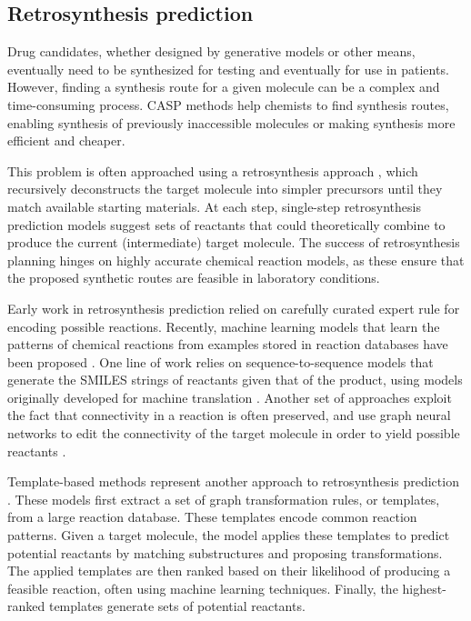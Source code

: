 \subsection{Retrosynthesis prediction}
Drug candidates, whether designed by generative models or other means, eventually need to be
synthesized for testing and eventually for use in patients. However, finding a synthesis route for a
given molecule can be a complex and time-consuming process. \Ac{CASP} methods help
chemists to find synthesis routes, enabling synthesis of previously inaccessible molecules or making
synthesis more efficient and cheaper.

This problem is often approached using a retrosynthesis approach
\citep{coreyComputerAssistedDesignComplex1969,coreyLogicChemicalSynthesis1991a}, which
recursively deconstructs the target molecule into simpler precursors until they match available
starting materials. At each step, single-step retrosynthesis prediction models suggest sets of
reactants that could theoretically combine to produce the current (intermediate) target molecule.
The success of retrosynthesis planning hinges on highly accurate chemical reaction models, as these
ensure that the proposed synthetic routes are feasible in laboratory conditions.

Early work in retrosynthesis prediction relied on carefully curated expert rule for encoding
possible reactions. Recently, machine learning models that learn the patterns of chemical reactions
from examples stored in reaction databases have been proposed
\citep{coleyMachineLearningComputerAided2018}. One line of work relies on sequence-to-sequence
models that generate the \ac{SMILES} strings of reactants given that of the product, using models
originally developed for machine translation
\citep{schwallerMolecularTransformerModel2019,namLinkingNeuralMachine2016,schwallerFoundTranslationPredicting2018,karpovTransformerModelRetrosynthesis2019,tetkoStateoftheartAugmentedNLP2020}.
Another set of approaches exploit the fact that connectivity in a reaction is often preserved, and
use graph neural networks to edit the connectivity of the target molecule in order to yield possible
reactants \citep{todo}.

Template-based methods represent another approach to retrosynthesis prediction \citep{seglerNeuralSymbolicMachineLearning2017,seglerNeuralSymbolicMachineLearning2017,daiRetrosynthesisPredictionConditional2020,fortunatoDataAugmentationPretraining2020}. These models first
extract a set of graph transformation rules, or templates, from a large reaction database. These
templates encode common reaction patterns. Given a target molecule, the model applies these
templates to predict potential reactants by matching substructures and proposing transformations.
The applied templates are then ranked based on their likelihood of producing a feasible reaction,
often using machine learning techniques. Finally, the highest-ranked templates generate sets of
potential reactants.

